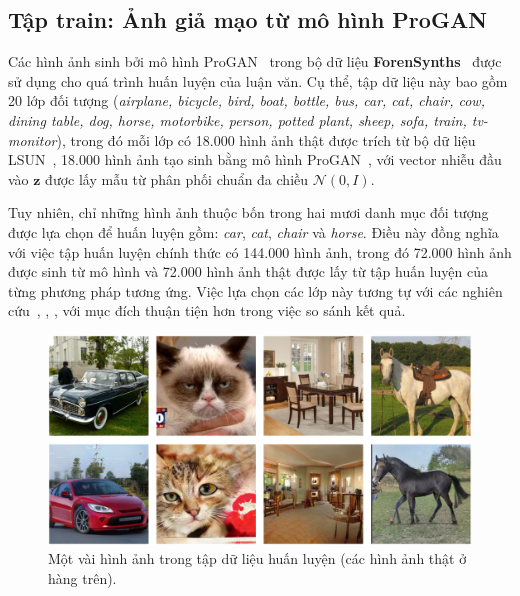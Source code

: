 \subsection{Tập \gls{train}: Ảnh giả mạo từ mô hình ProGAN}
\label{ssec:tap_du_lieu_progan}
%
Các hình ảnh sinh bởi mô hình ProGAN~\cite{karras2018progressive} trong bộ dữ liệu \textbf{ForenSynths}~\cite{Wang2019CNNGeneratedIA} được sử dụng cho quá trình huấn luyện của luận văn. 
%
Cụ thể, tập dữ liệu này bao gồm 20 lớp đối tượng (\textit{airplane, bicycle, bird, boat, bottle, bus, car, cat, chair, cow, dining table, dog, horse, motorbike, person, potted plant, sheep, sofa, train, tv-monitor}), trong đó mỗi lớp có 18.000 hình ảnh thật được trích từ bộ dữ liệu LSUN~\cite{Yu2015LSUNCO}, 18.000 hình ảnh tạo sinh bằng mô hình ProGAN~\cite{karras2018progressive}, với vector nhiễu đầu vào \( \mathbf{z} \) được lấy mẫu từ phân phối chuẩn đa chiều \( \mathcal{N}(0, I) \).
%
%

Tuy nhiên, chỉ những hình ảnh thuộc bốn trong hai mươi danh mục đối tượng được lựa chọn để huấn luyện gồm: \textit{car}, \textit{cat}, \textit{chair} và \textit{horse}.
%
Điều này đồng nghĩa với việc tập huấn luyện chính thức có 144.000 hình ảnh, trong đó 72.000 hình ảnh được sinh từ mô hình và 72.000 hình ảnh thật được lấy từ tập huấn luyện của từng phương pháp tương ứng.
%
Việc lựa chọn các lớp này tương tự với các nghiên cứu~\cite{Tan2023RethinkingTU}, \cite{Jeong2022FrePGANRD}, \cite{Jeong2021BiHPFBH}, với mục đích thuận tiện hơn trong việc so sánh kết quả.
%
%
\begin{figure}[ht!]
	\centering
	\includegraphics[width=1.0\linewidth]{Images/dataset_progan_samples.png}
	\begin{minipage}{1.0\linewidth}
		\vspace{5mm}
		\caption{Một vài hình ảnh trong tập dữ liệu huấn luyện (các hình ảnh thật ở hàng trên).}
		\label{fig:dataset_progan_samples}
	\end{minipage}
\end{figure}
%
